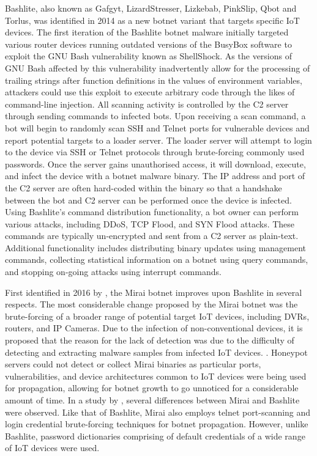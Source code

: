 Bashlite, also known as Gafgyt, LizardStresser, Lizkebab, PinkSlip, Qbot and Torlus, \citep{NHS2018} was identified in 2014 as a new botnet variant that targets specific IoT devices. The first iteration of the Bashlite botnet malware initially targeted various router devices running outdated versions of the BusyBox software to exploit the GNU Bash vulnerability known as ShellShock. \citep{Kovacs2014} As the versions of GNU Bash affected by this vulnerability inadvertently allow for the processing of trailing strings after function definitions in the values of environment variables, attackers could use this exploit to execute arbitrary code through the likes of command-line injection. \citep{CVE20146271} All scanning activity is controlled by the C2 server through sending commands to infected bots. \citet{Marzano2018} Upon receiving a scan command, a bot will begin to randomly scan SSH and Telnet ports for vulnerable devices and report potential targets to a loader server. The loader server will attempt to login to the device via SSH or Telnet protocols through brute-forcing commonly used passwords. Once the server gains unauthorised access, it will download, execute, and infect the device with a botnet malware binary. The IP address and port of the C2 server are often hard-coded within the binary so that a handshake between the bot and C2 server can be performed once the device is infected. Using Bashlite's command distribution functionality, a bot owner can perform various attacks, including DDoS, TCP Flood, and SYN Flood attacks. These commands are typically un-encrypted and sent from a C2 server as plain-text. Additional functionality includes distributing binary updates using management commands, collecting statistical information on a botnet using query commands, and stopping on-going attacks using interrupt commands.

First identified in 2016 by \citet{Malwaremustdie2016}, the Mirai botnet improves upon Bashlite in several respects. \citep{Marzano2018} The most considerable change proposed by the Mirai botnet was the brute-forcing of a broader range of potential target IoT devices, including DVRs, routers, and IP Cameras. Due to the infection of non-conventional devices, it is proposed that the reason for the lack of detection was due to the difficulty of detecting and extracting malware samples from infected IoT devices. \citep{Malwaremustdie2016}. Honeypot servers could not detect or collect Mirai binaries as particular ports, vulnerabilities, and device architectures common to IoT devices were being used for propagation, allowing for botnet growth to go unnoticed for a considerable amount of time. In a study by \citep{Marzano2018}, several differences between Mirai and Bashlite were observed. Like that of Bashlite, Mirai also employs telnet port-scanning and login credential brute-forcing techniques for botnet propagation. However, unlike Bashlite, password dictionaries comprising of default credentials of a wide range of IoT devices were used.

